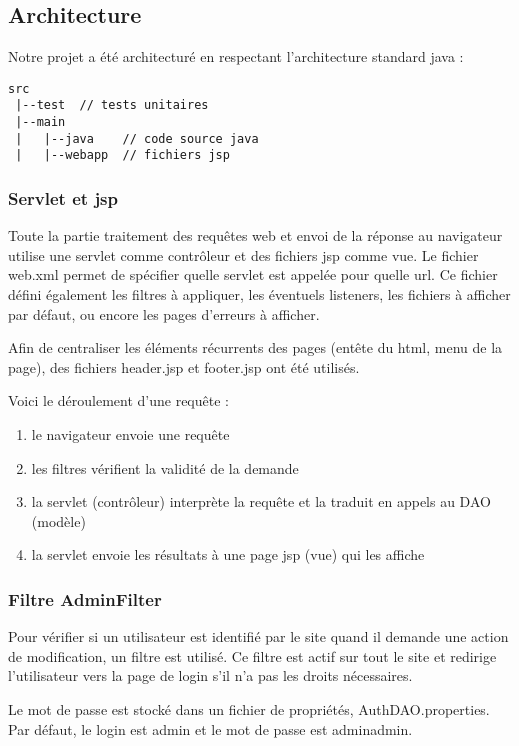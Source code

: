\subsection{Architecture}

Notre projet a été architecturé en respectant l'architecture standard java :
\begin{verbatim}
src
 |--test  // tests unitaires
 |--main
 |   |--java    // code source java
 |   |--webapp  // fichiers jsp
\end{verbatim}

\subsubsection{Servlet et jsp}
Toute la partie traitement des requêtes web et envoi de la réponse au navigateur utilise une servlet comme contrôleur et des fichiers jsp comme vue. Le fichier web.xml permet de spécifier quelle servlet est appelée pour quelle url. 
Ce fichier défini également les filtres à appliquer, les éventuels listeners, les fichiers à afficher par défaut, ou encore les pages d'erreurs à afficher.

Afin de centraliser les éléments récurrents des pages (entête du html, menu de la page), des fichiers header.jsp et footer.jsp ont été utilisés.

Voici le déroulement d'une requête : 
\begin{enumerate}
	\item le navigateur envoie une requête
	\item les filtres vérifient la validité de la demande
	\item la servlet (contrôleur) interprète la requête et la traduit en appels au DAO (modèle)
	\item la servlet envoie les résultats à une page jsp (vue) qui les affiche
\end{enumerate}

\subsubsection{Filtre AdminFilter}
Pour vérifier si un utilisateur est identifié par le site quand il demande une action de modification, un filtre est utilisé. 
Ce filtre est actif sur tout le site et redirige l'utilisateur vers la page de login s'il n'a pas les droits nécessaires.

Le mot de passe est stocké dans un fichier de propriétés, AuthDAO.properties. Par défaut, le login est admin et le mot de passe est adminadmin.

